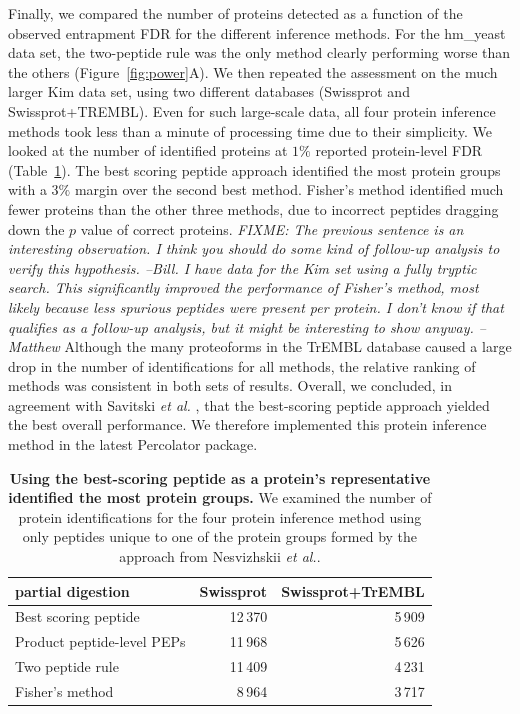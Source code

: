 \documentclass{article}
\begin{document}
Finally, we compared the number of proteins detected as a function of
the observed entrapment FDR for the different inference methods.  For
the hm\_yeast data set, the two-peptide rule was the only method
clearly performing worse than the others (Figure~\ref{fig:power}A).
We then repeated the assessment on the much larger Kim data set, using
two different databases (Swissprot and Swissprot+TREMBL).  Even for
such large-scale data, all four protein inference methods took less
than a minute of processing time due to their simplicity. We looked at
the number of identified proteins at $1\%$ reported protein-level FDR
(Table~\ref{tab:pandey-stats}).  The best scoring peptide approach
identified the most protein groups with a $3\%$ margin over the second
best method. Fisher's method identified much fewer proteins than the
other three methods, due to incorrect peptides dragging down the $p$
value of correct proteins. {\em FIXME: The previous sentence is an
  interesting observation. I think you should do some kind of
  follow-up analysis to verify this hypothesis. --Bill. I have 
data for the Kim set using a fully tryptic search. This significantly 
improved the performance of Fisher's method, most likely because less 
spurious peptides were present per protein. I don't know if that 
qualifies as a follow-up analysis, but it might be interesting to show
anyway. --Matthew} Although the
many proteoforms in the TrEMBL database caused a large drop in the
number of identifications for all methods, the relative ranking of
methods was consistent in both sets of results. Overall, we concluded,
in agreement with Savitski {\em et al.} \cite{savitski2015scalable},
that the best-scoring peptide approach yielded the best overall
performance.  We therefore implemented this protein inference method
in the latest Percolator package.

\begin{table}
  \begin{center}
    \begin{tabular}{lrr}
    \hline
    partial digestion & Swissprot & Swissprot+TrEMBL\\
    \hline
    Best scoring peptide & 12\,370 & 5\,909\\
    Product peptide-level PEPs & 11\,968 & 5\,626\\
    Two peptide rule & 11\,409 & 4\,231\\
    Fisher's method & 8\,964 & 3\,717\\
    \hline
    \end{tabular}
  \end{center}
\caption{\label{tab:pandey-stats}\textbf{Using the best-scoring
    peptide as a protein's representative identified the most protein
    groups.} We examined the number of protein identifications for the
  four protein inference method using only peptides unique to one of
  the protein groups formed by the approach from Nesvizhskii {\em et
    al.}. }
\end{table}
\end{document}
